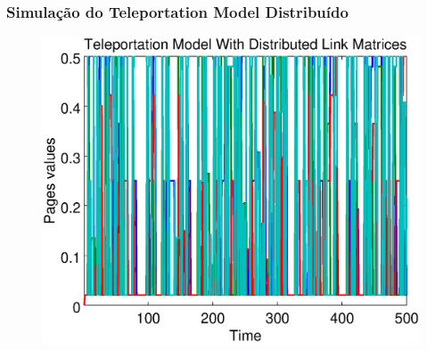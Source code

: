 \documentclass{beamer}
\begin{document}
\begin{frame}
	\frametitle{Simulação do Teleportation Model Distribuído}

\begin{figure}[!htb]
	\centering
	\includegraphics[scale=0.4]{figures/500/teledistributed}
	\label{}
\end{figure}	
	
\end{frame}
\end{document}
